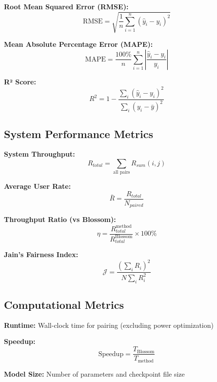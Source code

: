 \textbf{Root Mean Squared Error (RMSE):}
\begin{equation}
\text{RMSE} = \sqrt{\frac{1}{n} \sum_{i=1}^{n} (\hat{y}_i - y_i)^2}
\end{equation}

\textbf{Mean Absolute Percentage Error (MAPE):}
\begin{equation}
\text{MAPE} = \frac{100\%}{n} \sum_{i=1}^{n} \left|\frac{\hat{y}_i - y_i}{y_i}\right|
\end{equation}

\textbf{R² Score:}
\begin{equation}
R^2 = 1 - \frac{\sum_{i}(\hat{y}_i - y_i)^2}{\sum_{i}(y_i - \bar{y})^2}
\end{equation}

\subsection{System Performance Metrics}

\textbf{System Throughput:}
\begin{equation}
R_{total} = \sum_{\text{all pairs}} R_{sum}(i,j)
\end{equation}

\textbf{Average User Rate:}
\begin{equation}
\bar{R} = \frac{R_{total}}{N_{paired}}
\end{equation}

\textbf{Throughput Ratio (vs Blossom):}
\begin{equation}
\eta = \frac{R_{total}^{\text{method}}}{R_{total}^{\text{Blossom}}} \times 100\%
\end{equation}

\textbf{Jain's Fairness Index:}
\begin{equation}
\mathcal{J} = \frac{\left(\sum_{i} R_i\right)^2}{N \sum_{i} R_i^2}
\end{equation}

\subsection{Computational Metrics}

\textbf{Runtime:} Wall-clock time for pairing (excluding power optimization)

\textbf{Speedup:}
\begin{equation}
\text{Speedup} = \frac{T_{\text{Blossom}}}{T_{\text{method}}}
\end{equation}

\textbf{Model Size:} Number of parameters and checkpoint file size

